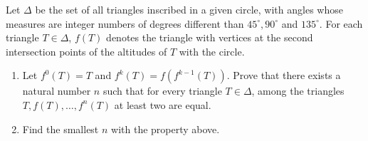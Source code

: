 Let $\Delta$ be the set of all triangles inscribed in a given circle, with angles whose measures are integer numbers of degrees different than $45^\circ,90^\circ$ and $135^\circ$. For each triangle $T\in\Delta$, $f(T)$ denotes the triangle with vertices at the second intersection points of the altitudes of $T$ with the circle.

\begin{enumerate}[label = (\alph*)]
  \item
	Let $f^0(T)=T$ and $f^k(T)=f(f^{k-1}(T))$.
	Prove that there exists a natural number $n$ such that for every triangle $T\in\Delta$, among the triangles
	$T,\allowbreak f(T),\allowbreak \ldots,\allowbreak f^n(T)$
	at least two are equal.
	\item Find the smallest $n$ with the property above.
\end{enumerate}
